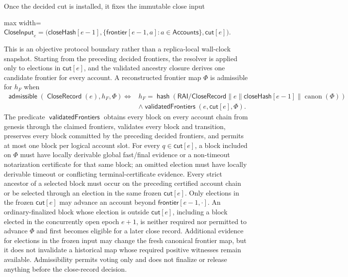 \documentclass[sigplan,twocolumn,review,anonymous]{acmart}
\newcommand{\func}[1]{\operatorname{\mathsf{#1}}}
\newcommand{\hash}{\func{hash}}
\newcommand{\CloseRecord}{\func{CloseRecord}}
\newcommand{\admissible}{\func{admissible}}
\newcommand{\frontier}{\mathsf{frontier}}
\newcommand{\closeHash}{\mathsf{closeHash}}
\newcommand{\closeCut}{\mathsf{cut}}
\begin{document}
Once the decided cut is installed, it fixes the immutable close input
\begin{center}
\begin{adjustbox}{max width=\columnwidth}
\(\displaystyle
\mathsf{CloseInput}_e=
\bigl(\closeHash[e-1],\{\frontier[e-1,a]:a\in\mathsf{Accounts}\},\closeCut[e]\bigr).
\)
\end{adjustbox}
\end{center}
This is an objective protocol boundary rather than a replica-local wall-clock snapshot.  Starting from
the preceding decided frontiers, the resolver is applied only to elections in \(\closeCut[e]\), and the
validated ancestry closure derives one candidate frontier for every account.  A reconstructed frontier
map \(\Phi\) is admissible for \(h_F\) when
\[
\begin{aligned}
\admissible(\CloseRecord(e),h_F,\Phi)\iff{}&
 h_F=\hash(\mathsf{RAI/CloseRecord}\parallel e\parallel\closeHash[e-1]
       \parallel\operatorname{canon}(\Phi))\\
&\wedge\func{validatedFrontiers}(e,\closeCut[e],\Phi).
\end{aligned}
\]
The predicate \(\func{validatedFrontiers}\) obtains every block on every account chain from genesis
through the claimed frontiers, validates every block and transition, preserves every block committed by
the preceding decided frontiers, and permits at most one block per logical account slot.  For every
\(q\in\closeCut[e]\), a block included on \(\Phi\) must have locally derivable global fast/final evidence
or a non-timeout notarization certificate for that same block; an omitted election must have locally
derivable timeout or conflicting terminal-certificate evidence.  Every strict ancestor of a selected
block must occur on the preceding certified account chain or be selected through an election in the
same frozen \(\closeCut[e]\).  Only elections in
the frozen \(\closeCut[e]\) may advance an account beyond \(\frontier[e-1,\cdot]\).  An ordinary-finalized
block whose election is outside \(\closeCut[e]\), including a block elected in the concurrently open
epoch \(e+1\), is neither required nor permitted to advance \(\Phi\) and first becomes eligible for a
later close record.  Additional evidence for elections in the frozen input may change the fresh
canonical frontier map, but it does not invalidate a historical map whose required positive witnesses
remain available.  Admissibility permits voting only and does not finalize or release anything before
the close-record decision.
\end{document}
